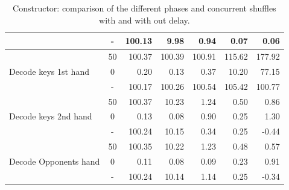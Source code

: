 \documentclass[twoside,11pt,openright]{report}
\begin{document}
\begin{table}[!htb]
\begin{subtable}{\textwidth}
{\begin{tabular}{l || c |r r r r r}
                              &  - & 100.13 &  9.98 & 0.94 & 0.07 & 0.06 \\
    \hline
    \multirow{3}{*}{Decode keys 1st hand} & 50 & 100.37 & 100.39 & 100.91 & 115.62 & 177.92 \\
                                          &  0 &   0.20 &   0.13 &   0.37 &  10.20 &  77.15 \\
                                          \cline{2-7}
                                          &  - & 100.17 & 100.26 & 100.54 & 105.42 & 100.77 \\
    \hline
    \multirow{3}{*}{Decode keys 2nd hand} & 50 & 100.37 & 10.23 & 1.24 & 0.50 & 0.86 \\
                                          &  0 &   0.13 &  0.08 & 0.90 & 0.25 & 1.30 \\
                                          \cline{2-7}
                                          &  - & 100.24 & 10.15 & 0.34 & 0.25 & -0.44 \\
    \hline
    \multirow{3}{*}{Decode Opponents hand} & 50 & 100.35 & 10.22 & 1.23 & 0.48 & 0.57 \\
                                           &  0 &   0.11 &  0.08 & 0.09 & 0.23 & 0.91 \\
                                           \cline{2-7}
                                           &  - & 100.24 & 10.14 & 1.14 & 0.25 & -0.34
    \end{tabular}
    }
    \caption{Constructor: comparison of the different phases and concurrent shuffles with and with out delay.}
    \end{subtable}%

    \vspace*{1cm}


\end{table}
\end{document}
